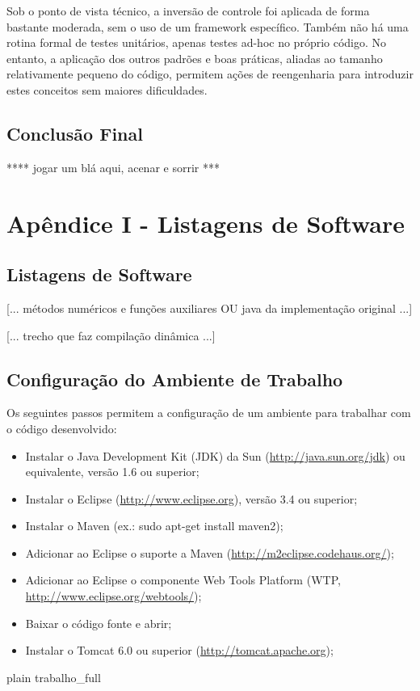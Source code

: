 \documentclass{abnt}
\begin{document}
Sob o ponto de vista técnico, a inversão de controle foi aplicada de forma bastante moderada, sem o uso de um framework específico. Também não há uma rotina formal de testes unitários, apenas testes ad-hoc no próprio código. No entanto, a aplicação dos outros padrões e boas práticas, aliadas ao tamanho relativamente pequeno do código, permitem ações de reengenharia para introduzir estes conceitos sem maiores dificuldades.

\section {Conclusão Final}

**** jogar um blá aqui, acenar e sorrir ***

\appendix
\chapter {Apêndice I - Listagens de Software}
\section {Listagens de Software}

[... métodos numéricos e funções auxiliares OU java da implementação original ...]

[... trecho que faz compilação dinâmica ...]

\section {Configuração do Ambiente de Trabalho}

Os seguintes passos permitem a configuração de um ambiente para trabalhar com o código desenvolvido:

\begin{itemize}
\item Instalar o Java Development Kit (JDK) da Sun (\url{http://java.sun.org/jdk}) ou equivalente, versão 1.6 ou superior;
\item Instalar o Eclipse (\url{http://www.eclipse.org}), versão 3.4 ou superior;
\item Instalar o Maven (ex.: sudo apt-get install maven2);
\item Adicionar ao Eclipse o suporte a Maven (\url{http://m2eclipse.codehaus.org/});
\item Adicionar ao Eclipse o componente Web Tools Platform (WTP, \url{http://www.eclipse.org/webtools/});
\item Baixar o código fonte e abrir;
\item Instalar o Tomcat 6.0 ou superior (\url{http://tomcat.apache.org});
\end{itemize}

\nocite{*}
 {plain}
 {trabalho_full}
\end{document}
